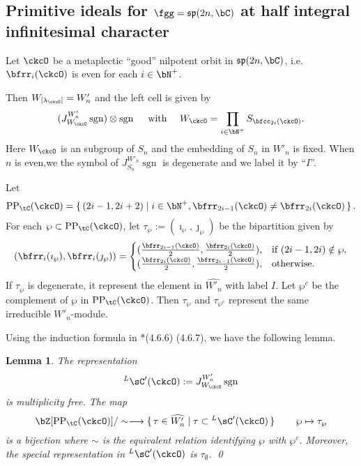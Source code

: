 \documentclass[12pt,a4paper]{amsart}
\def\fsp{\mathfrak{sp}}
\newcommand{\sgn}{\operatorname{sgn}}
\numberwithin{equation}{section}
\newtheorem{lem}[thm]{Lemma}
\theoremstyle{remark}
\def\PP#1{\mathrm{PP}_{#1}}
\begin{document}
\subsection{Primitive ideals for $\fgg=\fsp(2n,\bC)$ at half integral infinitesimal character}

Let $\ckcO$ be a metaplectic ``good'' nilpotent orbit in $\fsp(2n,\bC)$, i.e.
$\bfrr_i(\ckcO)$ is even for each $i\in \bN^+$.

Then $W_{[\lambda_{\ckcO}]} = W'_n$ and the left cell is given by
\[
(J_{W_\ckcO}^{W'_n} \sgn) \otimes \sgn \quad \text{ with } \quad W_\ckcO = \prod_{i\in \bN^+} S_{\bfcc_{2i}(\ckcO)}.
\]
Here $W_\ckcO$ is an subgroup of $S_n$ and the embedding of $S_n$ in $W'_n$ is fixed.
When $n$ is even,we the symbol of $J_{S_n}^{W'_n} \sgn$ is degenerate and we label it by ``$I$''.

\def\PPtC{\PP{\tC}}
 Let
 \[
  \PPtC(\ckcO) = \set{(2i-1,2i+2)|i\in \bN^+, \bfrr_{2i-1}(\ckcO)\neq \bfrr_{2i}(\ckcO)}.
 \]
  For each $\wp\subset \PPtC(\ckcO)$, let $\tau_\wp := (\imath_\wp,\jmath_\wp)$ be the bipartition
  given by
  \[
    (\bfrr_i(\imath_\wp),\bfrr_i(\jmath_\wp)) =\begin{cases}
      (\frac{\bfrr_{2i-1}(\ckcO)}{2}, \frac{\bfrr_{2i}(\ckcO)}{2}),   & \text{if } (2i-1,2i)\notin \wp, \\
      (\frac{\bfrr_{2i}(\ckcO)}{2}, \frac{\bfrr_{2i-1}(\ckcO)}{2}), & \text{otherwise.}
    \end{cases}
  \]
  If $\tau_\wp$ is degenerate, it represent the element in $\widehat{W'_n}$
  with label $I$.
  Let $\wp^c$ be the complement of $\wp$ in $\PPtC(\ckcO)$.
  Then $\tau_\wp$ and $\tau_{\wp^c}$ represent the same irreducible $W'_n$-module.

  \def\LCC{{}^L\sC'}
Using the induction formula in \cite{L}*{(4.6.6) (4.6.7)}, we have the following lemma.
\begin{lem}
The representation
\[
  \LCC(\ckcO) :=J_{W_\ckcO}^{W'_n} \sgn
\]
is multiplicity free.
The map
\[
  \bZ[\PPtC(\ckcO)]/\sim \longrightarrow \set{\tau\in \widehat{W'_n}| \tau\subset \LCC(\ckcO)}
  \qquad \wp \mapsto \tau_\wp
\]
is a bijection where $\sim$ is the equivalent relation identifying $\wp$ with $\wp^c$.
Moreover, the special representation in $\LCC(\ckcO)$ is $\tau_\emptyset$.
\qed
\end{lem}
\end{document}
